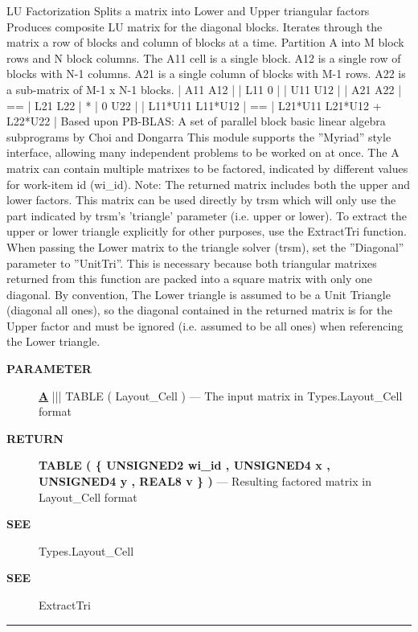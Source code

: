 LU Factorization Splits a matrix into Lower and Upper triangular factors Produces composite LU matrix for the diagonal blocks. Iterates through the matrix a row of blocks and column of blocks at a time. Partition A into M block rows and N block columns. The A11 cell is a single block. A12 is a single row of blocks with N-1 columns. A21 is a single column of blocks with M-1 rows. A22 is a sub-matrix of M-1 x N-1 blocks. | A11 A12 | | L11 0 | | U11 U12 | | A21 A22 | == | L21 L22 | * | 0 U22 | | L11*U11 L11*U12 | == | L21*U11 L21*U12 + L22*U22 | Based upon PB-BLAS: A set of parallel block basic linear algebra subprograms by Choi and Dongarra This module supports the ''Myriad'' style interface, allowing many independent problems to be worked on at once. The A matrix can contain multiple matrixes to be factored, indicated by different values for work-item id (wi\_id). Note: The returned matrix includes both the upper and lower factors. This matrix can be used directly by trsm which will only use the part indicated by trsm's 'triangle' parameter (i.e. upper or lower). To extract the upper or lower triangle explicitly for other purposes, use the ExtractTri function. When passing the Lower matrix to the triangle solver (trsm), set the ''Diagonal'' parameter to ''UnitTri''. This is necessary because both triangular matrixes returned from this function are packed into a square matrix with only one diagonal. By convention, The Lower triangle is assumed to be a Unit Triangle (diagonal all ones), so the diagonal contained in the returned matrix is for the Upper factor and must be ignored (i.e. assumed to be all ones) when referencing the Lower triangle.






\par
\begin{description}
\item [\colorbox{tagtype}{\color{white} \textbf{\textsf{PARAMETER}}}] \textbf{\underline{A}} ||| TABLE ( Layout\_Cell ) --- The input matrix in Types.Layout\_Cell format
\end{description}







\par
\begin{description}
\item [\colorbox{tagtype}{\color{white} \textbf{\textsf{RETURN}}}] \textbf{TABLE ( \{ UNSIGNED2 wi\_id , UNSIGNED4 x , UNSIGNED4 y , REAL8 v \} )} --- Resulting factored matrix in Layout\_Cell format
\end{description}






\par
\begin{description}
\item [\colorbox{tagtype}{\color{white} \textbf{\textsf{SEE}}}] Types.Layout\_Cell
\item [\colorbox{tagtype}{\color{white} \textbf{\textsf{SEE}}}] ExtractTri
\end{description}




\rule{\linewidth}{0.5pt}
